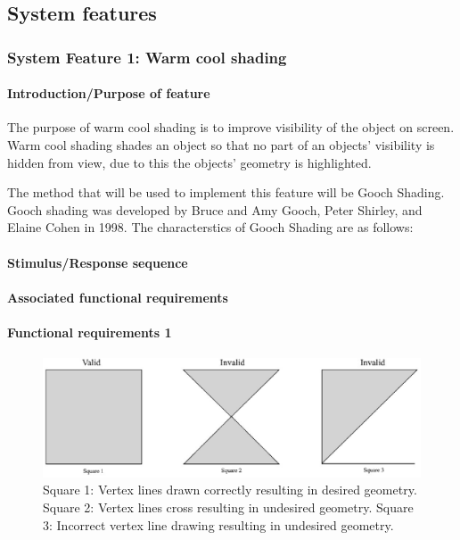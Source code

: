 \documentclass[10pt,journal,compsoc]{IEEEtran}
\begin{document}
\begin{flushleft}
\subsection{System features}
\vspace{3mm}

\subsubsection{System Feature 1: Warm cool shading}
	
\paragraph{Introduction/Purpose of feature}
The purpose of warm cool shading is to improve visibility of the object on screen.
Warm cool shading shades an object so that no part of an objects' visibility is hidden from view, due to this the objects' geometry is highlighted.

The method that will be used to implement this feature will be Gooch Shading.
Gooch shading was developed by Bruce and Amy Gooch, Peter Shirley, and Elaine Cohen in 1998.
The characterstics of Gooch Shading are as follows:

\paragraph{Stimulus/Response sequence}

\paragraph{Associated functional requirements}

\paragraph{Functional requirements 1}
\begin{figure} [h]
  \includegraphics[width=\linewidth]{squares.eps}
  \caption
{ \newline \hspace{\linewidth}
Square 1: Vertex lines drawn correctly resulting in desired geometry. \newline \hspace{\linewidth}
Square 2: Vertex lines cross resulting in undesired geometry. \newline \hspace{\linewidth}
Square 3: Incorrect vertex line drawing resulting in undesired geometry.}
  \label{fig:squares}
\end{figure}


\end{flushleft}
\end{document}
